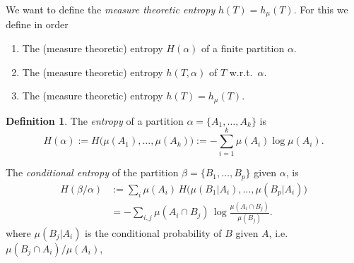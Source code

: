 \documentclass[a4paper]{amsart}
\theoremstyle{plain}
\theoremstyle{definition}
\newtheorem{definition}[theorem]{Definition}%
\theoremstyle{remark}
\begin{document}
\medskip
We want to define the \emph{measure theoretic entropy} $ h(T) = h_\mu(T) $. 
  For this we define in order
 \begin{enumerate}
 \item The (measure theoretic) entropy $ H(\alpha ) $ of a finite partition $ \alpha $.
 \item The  (measure theoretic) entropy $ h(T, \alpha ) $ of $ T $ w.r.t.\ $ \alpha $.
 \item  The (measure theoretic) entropy  $ h(T) = h_\mu(T) $. 
\end{enumerate}  
 
 
\begin{definition} The \emph{entropy} of a partition $ \alpha = \{A_1,\dots, A_k\} $ is
\[   H(\alpha ) := H\big(\mu(A_1),\dots, \mu(A_k)\big):=     - \sum_{i=1}^k \mu(A_i)\log \mu(A_i). \] 

The \emph{conditional entropy}  of the partition $ \beta = \{B_1,\dots, B_p\}$ given $ \alpha $, is
\begin{align*} 
H(\beta/\alpha)  &:= \sum_i \mu(A_i)\, H\big(\mu(B_1|A_i),\dots, \mu(B_p|A_i)\big) \\
&= - \sum_{i ,j}\mu(A_i\cap B_j)\, \log\frac{\mu(A_i\cap B_j)}{\mu(B_j)} . 
\end{align*} 
where $ \mu(B_j|A_i) $ is the conditional probability of $ B $ given $ A $, i.e.\ $ \mu(B_j\cap A_i)/\mu(A_i) $, 
\end{definition}
 
\end{document}
